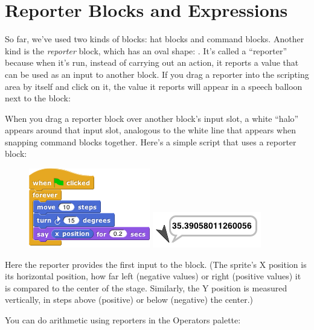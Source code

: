 \documentclass{report}
\begin{document}
\section{Reporter Blocks and Expressions}

So far, we've used two kinds of blocks: hat blocks and command blocks. Another kind is the \emph{reporter} block, which has an oval shape: . It's called a ``reporter'' because when it's run, instead of carrying out an action, it reports a value that can be used as an input to another block. If you drag a reporter into the scripting area by itself and click on it, the value it reports will appear in a speech balloon next to the block:\nopagebreak


When you drag a reporter block over another block's input slot, a white ``halo'' appears around that input slot, analogous to the white line that appears when snapping command blocks together. Here's a simple script that uses a reporter block:\nopagebreak

\begin{figure}[H]
\centering
\includegraphics[scale=\defaultGraphicsScale]{example-script-that-uses-a-reporter}%
\hspace{2em}%
\includegraphics{../common/turtle-says-its-position}
\end{figure}

Here the  reporter provides the first input to the  block. (The sprite's X position is its horizontal position, how far left (negative values) or right (positive values) it is compared to the center of the stage. Similarly, the Y position is measured vertically, in steps above (positive) or below (negative) the center.)

You can do arithmetic using reporters in the Operators palette:\nopagebreak
\end{document}
